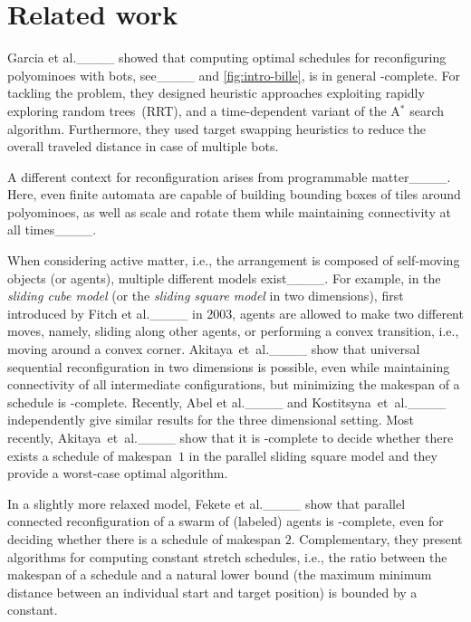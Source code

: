 \section{Related work}
\label{subsec:related-work}

Garcia et al.____ showed that computing optimal schedules for reconfiguring polyominoes with \BILLE bots, see____ and \cref{fig:intro-bille}, is in general \NP-complete.
For tackling the problem, they designed heuristic approaches exploiting rapidly exploring random trees~(RRT), and a time-dependent variant of the A$^{*}$ search algorithm.
Furthermore, they used target swapping heuristics to reduce the overall traveled distance in case of multiple \BILLE bots.

A different context for reconfiguration arises from
programmable matter____.
Here, even finite automata are capable of building bounding boxes of tiles
around polyominoes, as well as scale and rotate them while maintaining
connectivity at all times____.

When considering active matter, i.e., the arrangement is composed of self-moving objects (or agents), multiple different models exist____.
For example, in the \emph{sliding cube model} (or the \emph{sliding square model} in two dimensions), first introduced by Fitch et al.____ in 2003, agents are allowed to make two different moves, namely, sliding along other agents, or performing a convex transition, i.e., moving around a convex corner.
Akitaya~et~al.____ show that universal sequential reconfiguration in two dimensions is possible, even while maintaining connectivity of all intermediate configurations, but minimizing the makespan of a schedule is \NP-complete.
Recently, Abel et al.____ and Kostitsyna~et~al.____ independently give similar results for the three dimensional setting.
Most recently, Akitaya~et~al.____ show that it is \NP-complete to decide whether there exists a schedule of makespan~$1$ in the parallel sliding square model and they provide a worst-case optimal algorithm.

In a slightly more relaxed model, Fekete et al.____ show that parallel connected reconfiguration of a swarm of (labeled) agents is \NP-complete, even for deciding whether there is a schedule of makespan $2$.
Complementary, they present algorithms for computing constant stretch schedules, i.e., the ratio between the makespan of a schedule and a natural lower bound (the maximum minimum distance between an individual start and target position) is bounded by a constant.